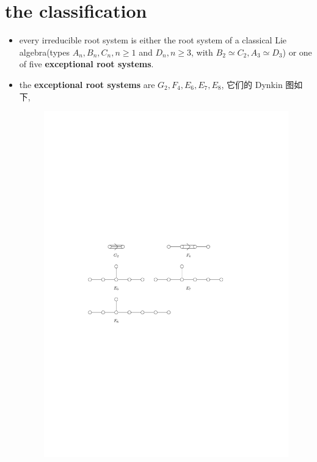 \section{the classification}
\begin{itemize}
	\item every irreducible root system is either the root system of a classical Lie algebra(types $A_n, B_n, C_n, n \geq 1$ and $D_n, n \geq 3$, with $B_2 \simeq C_2, A_3 \simeq D_3$) or one of five \textbf{exceptional root systems}.
	
	\item the \textbf{exceptional root systems} are $G_2, F_4, E_6, E_7, E_8$, 它们的 Dynkin 图如下,
	
	\begin{figure}[H]
		\centering
		\includegraphics[scale=1]{figures/exceptional Dynkin diagrams.pdf}
	\end{figure}
	

\end{itemize}

